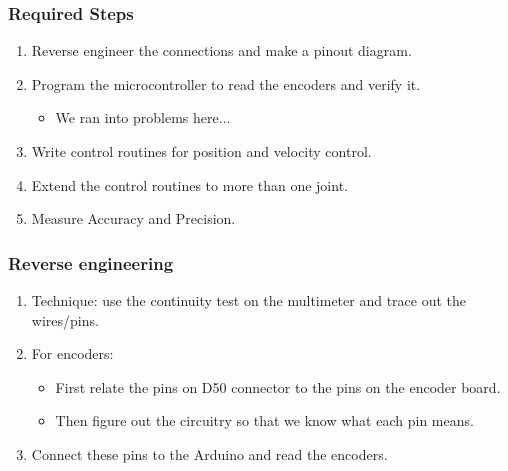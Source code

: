 \documentclass{beamer}
\begin{document}
  \begin{frame}
    \frametitle{Required Steps}
    \begin{enumerate}
    \item<1-> Reverse engineer the connections and make a pinout
      diagram.
    \item<2-> Program the microcontroller to read the encoders and verify it.
      \begin{itemize}
      \item<2-> We ran into problems here...
      \end{itemize}
    \item<3-> Write control routines for position and velocity control.
    \item<4-> Extend the control routines to more than one joint.
    \item<5-> Measure Accuracy and Precision.
    \end{enumerate}
  \end{frame}
  
  \begin{frame}
    \frametitle{Reverse engineering}
    \begin{enumerate}
      \item<1-> Technique: use the continuity test on the multimeter
        and trace out the wires/pins. 
      \item<2-> For encoders:
        \begin{itemize}
          \item<2-> First relate the pins on D50 connector to the pins
            on the encoder board.
          \item<3-> Then figure out the circuitry so that we know
            what each pin means.
        \end{itemize}
      \item<4-> Connect these pins to the Arduino and read the
        encoders. 
    \end{enumerate}
  \end{frame}
\end{document}
